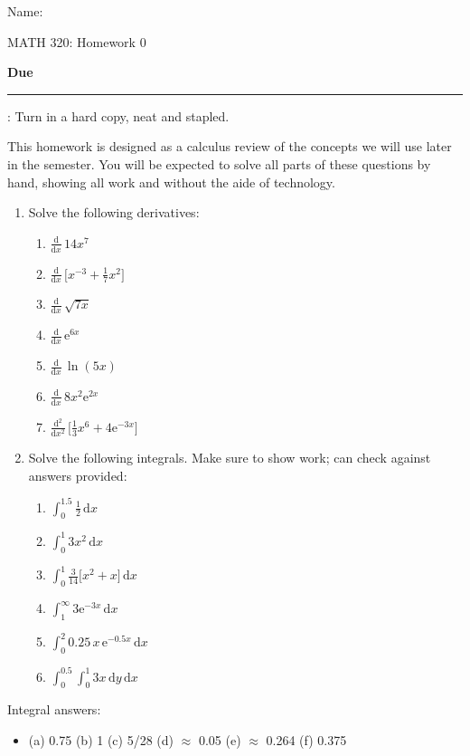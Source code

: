 \documentclass{article}
\newcommand{\blankul}[1]{\rule[-1.5mm]{#1}{0.15mm}}	%
\newcommand{\ddx}[1]{\frac{\mathrm{d}}{\mathrm{d} #1}\,}		%
\newcommand{\e}{\mathrm{e}}		%
\newcommand{\integral}[4]{\displaystyle \int_{#1}^{#2} #3 \,\mathrm{d} #4}		%
\begin{document}
\hspace{375pt}Name:

\begin{center}
{\Huge MATH 320: Homework 0}
\end{center}

\bigskip\bigskip

{\large \textbf{Due} \blankul{4cm}: Turn in a hard copy, neat and stapled.}\bigskip

This homework is designed as a calculus review of the concepts we will use later in the semester. You will be expected to solve all parts of these questions by hand, showing all work and without the aide of technology.\bigskip

\begin{enumerate}
    \item Solve the following derivatives:
    \begin{enumerate}
        \item $\ddx{x} 14x^7$
        \item $\ddx{x} \big[x^{-3} + \frac{1}{7}x^2\big]$
        \item $\ddx{x} \sqrt{7x}$
        \item $\ddx{x} \e^{6x}$
        \item $\ddx{x} \ln(5x)$
        	\item $\ddx{x} 8x^2 \e^{2x}$
        	\item $\frac{\mathrm{d}^2}{\mathrm{d} x^2}\, \big[\frac{1}{3}x^6 + 4\e^{-3x}\big]$
    \end{enumerate}\bigskip
    
    \item Solve the following integrals. Make sure to show work; can check against answers provided:
    \begin{enumerate}
        \item $\integral{0}{1.5}{\frac{1}{2}}{x}$
        \item $\integral{0}{1}{3x^2}{x}$
        \item $\integral{0}{1}{\frac{3}{14} \big[x^2 + x \big]}{x}$
        \item $\integral{1}{\infty}{3 \e^{-3x}}{x}$
        \item $\integral{0}{2}{0.25 \, x \, \e^{-0.5 x}}{x}$
        \item $\integral{0}{0.5}{\integral{0}{1}{3x}{y}}{x}$
    \end{enumerate}
\end{enumerate}\bigskip

Integral answers:
\begin{itemize}
    \item[] (a) 0.75 \hspace{10pt} (b) 1 \hspace{10pt} (c) 5/28 \hspace{10pt} (d) $\approx$ 0.05 \hspace{10pt} (e) $\approx$ 0.264 \hspace{10pt} (f) 0.375
\end{itemize}
\end{document}
